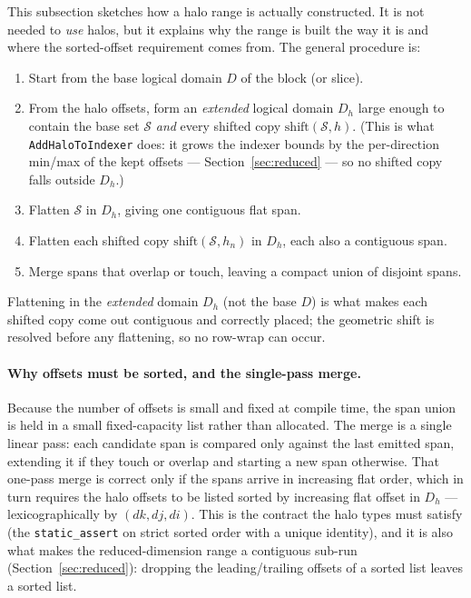 \documentclass[11pt]{article}
\newcommand{\code}[1]{\lstinline[basicstyle=\ttfamily]|#1|}
\newcommand{\Sset}{\mathcal{S}}
\begin{document}
This subsection sketches how a halo range is actually constructed. It is not needed
to \emph{use} halos, but it explains why the range is built the way it is and where
the sorted-offset requirement comes from. The general procedure is:
\begin{enumerate}
\item Start from the base logical domain $D$ of the block (or slice).
\item From the halo offsets, form an \emph{extended} logical domain $D_h$ large
  enough to contain the base set $\Sset$ \emph{and} every shifted copy
  $\mathrm{shift}(\Sset, h)$. (This is what \code{AddHaloToIndexer} does: it grows
  the indexer bounds by the per-direction min/max of the kept offsets ---
  Section~\ref{sec:reduced} --- so no shifted copy falls outside $D_h$.)
\item Flatten $\Sset$ in $D_h$, giving one contiguous flat span.
\item Flatten each shifted copy $\mathrm{shift}(\Sset, h_n)$ in $D_h$, each also a
  contiguous span.
\item Merge spans that overlap or touch, leaving a compact union of disjoint spans.
\end{enumerate}
Flattening in the \emph{extended} domain $D_h$ (not the base $D$) is what makes each
shifted copy come out contiguous and correctly placed; the geometric shift is
resolved before any flattening, so no row-wrap can occur.

\paragraph{Why offsets must be sorted, and the single-pass merge.} Because the
number of offsets is small and fixed at compile time, the span union is held in a
small fixed-capacity list rather than allocated. The merge is a single linear pass:
each candidate span is compared only against the last emitted span, extending it if
they touch or overlap and starting a new span otherwise. That one-pass merge is
correct only if the spans arrive in increasing flat order, which in turn requires
the halo offsets to be listed sorted by increasing flat offset in $D_h$ ---
lexicographically by $(dk, dj, di)$. This is the contract the halo types must
satisfy (the \code{static_assert} on strict sorted order with a unique identity),
and it is also what makes the reduced-dimension range a contiguous sub-run
(Section~\ref{sec:reduced}): dropping the leading/trailing offsets of a sorted list
leaves a sorted list.
\end{document}
